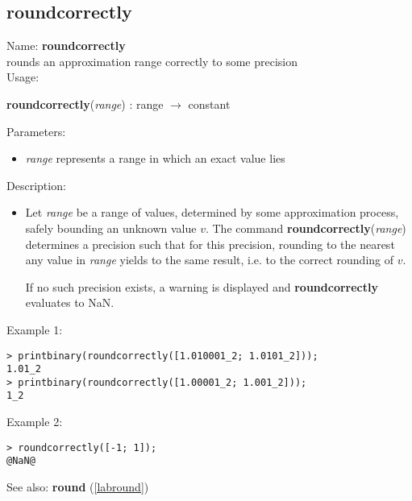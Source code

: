 \subsection{roundcorrectly}
\label{labroundcorrectly}
\noindent Name: \textbf{roundcorrectly}\\
rounds an approximation range correctly to some precision\\
\noindent Usage: 
\begin{center}
\textbf{roundcorrectly}(\emph{range}) : \textsf{range} $\rightarrow$ \textsf{constant}\\
\end{center}
Parameters: 
\begin{itemize}
\item \emph{range} represents a range in which an exact value lies
\end{itemize}
\noindent Description: \begin{itemize}

\item Let \emph{range} be a range of values, determined by some approximation
   process, safely bounding an unknown value $v$. The command
   \textbf{roundcorrectly}(\emph{range}) determines a precision such that for this precision,
   rounding to the nearest any value in \emph{range} yields to the same
   result, i.e. to the correct rounding of $v$.
    
   If no such precision exists, a warning is displayed and \textbf{roundcorrectly}
   evaluates to NaN.
\end{itemize}
\noindent Example 1: 
\begin{center}\begin{minipage}{15cm}\begin{Verbatim}[frame=single]
> printbinary(roundcorrectly([1.010001_2; 1.0101_2]));
1.01_2
> printbinary(roundcorrectly([1.00001_2; 1.001_2]));
1_2
\end{Verbatim}
\end{minipage}\end{center}
\noindent Example 2: 
\begin{center}\begin{minipage}{15cm}\begin{Verbatim}[frame=single]
> roundcorrectly([-1; 1]);
@NaN@
\end{Verbatim}
\end{minipage}\end{center}
See also: \textbf{round} (\ref{labround})
